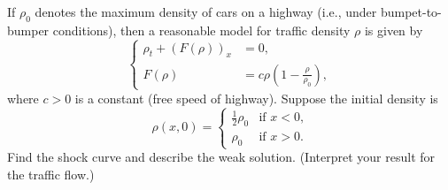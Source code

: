 \begin{problem}
  If \(\rho_0\) denotes the maximum density of cars on a highway (i.e.,
  under bumpet-to-bumper conditions), then a reasonable model for traffic
  density \(\rho\) is given by
  \[
     \left\{
       \begin{aligned}
         \rho_t+(F(\rho))_x&=0,\\
         F(\rho)&=c\rho\left(1-\frac{\rho}{\rho_0}\right),
      \end{aligned}
    \right.
  \]
  where \(c>0\) is a constant (free speed of highway). Suppose the initial
  density is
  \[
    \rho(x,0)=
    \begin{cases}
      \frac{1}{2}\rho_0&\text{if \(x<0\),}\\
      \rho_0&\text{if \(x>0\).}
    \end{cases}
  \]
  Find the shock curve and describe the weak solution. (Interpret your
  result for the traffic flow.)
\end{problem}
